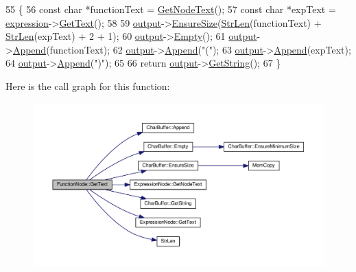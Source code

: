 \begin{DoxyCode}
55 \{
56     \textcolor{keyword}{const} \textcolor{keywordtype}{char} *functionText = \hyperlink{classExpressionNode_a42a5e9562b0f645a19dcc83f698069b5}{GetNodeText}();
57     \textcolor{keyword}{const} \textcolor{keywordtype}{char} *expText = \hyperlink{classFunctionNode_ad7577b179a1937aaf8a0058bb5b546dc}{expression}->\hyperlink{classExpressionNode_a0bbf243108a14eaf963a8161ffd8eb92}{GetText}();
58 
59     \hyperlink{classSyntaxNode_a1180628cbe3fce43930cee0df5a9ce5c}{output}->\hyperlink{classCharBuffer_ad1907009b5ad136692b989fa96bf2f7e}{EnsureSize}(\hyperlink{clib_8h_a67ec56eb98b49515d35005a5b3bf9a32}{StrLen}(functionText) + \hyperlink{clib_8h_a67ec56eb98b49515d35005a5b3bf9a32}{StrLen}(expText) + 2 + 1);
60     \hyperlink{classSyntaxNode_a1180628cbe3fce43930cee0df5a9ce5c}{output}->\hyperlink{classCharBuffer_abe39d3fd7d8b9c8ec343af2cae7adc96}{Empty}();
61     \hyperlink{classSyntaxNode_a1180628cbe3fce43930cee0df5a9ce5c}{output}->\hyperlink{classCharBuffer_a045b38735f7b3007c1b98d3d7b7feafe}{Append}(functionText);
62     \hyperlink{classSyntaxNode_a1180628cbe3fce43930cee0df5a9ce5c}{output}->\hyperlink{classCharBuffer_a045b38735f7b3007c1b98d3d7b7feafe}{Append}(\textcolor{stringliteral}{"("});
63     \hyperlink{classSyntaxNode_a1180628cbe3fce43930cee0df5a9ce5c}{output}->\hyperlink{classCharBuffer_a045b38735f7b3007c1b98d3d7b7feafe}{Append}(expText);
64     \hyperlink{classSyntaxNode_a1180628cbe3fce43930cee0df5a9ce5c}{output}->\hyperlink{classCharBuffer_a045b38735f7b3007c1b98d3d7b7feafe}{Append}(\textcolor{stringliteral}{")"});
65 
66     \textcolor{keywordflow}{return} \hyperlink{classSyntaxNode_a1180628cbe3fce43930cee0df5a9ce5c}{output}->\hyperlink{classCharBuffer_a7dfd3feaaf80f318ba44efe15b1ec44b}{GetString}();
67 \}
\end{DoxyCode}


Here is the call graph for this function\+:
\nopagebreak
\begin{figure}[H]
\begin{center}
\leavevmode
\includegraphics[width=350pt]{d7/d06/classFunctionNode_a86b42caf0a4019d8f594dc994bb094e7_cgraph}
\end{center}
\end{figure}


